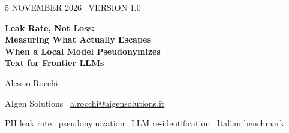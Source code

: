 \documentclass[11pt,a4paper]{article}
\begin{document}
\thispagestyle{empty}
\hfill{\sffamily\small\color{muted}5 NOVEMBER 2026 \textperiodcentered\ VERSION 1.0}

\vspace{1.4em}
{\noindent\sffamily\bfseries\fontsize{22}{27}\selectfont\color{aigen}Leak Rate, Not Loss:\\ Measuring What Actually Escapes\\ When a Local Model Pseudonymizes\\ Text for Frontier LLMs\par}

\vspace{0.9em}\noindent{\color{aigen}\rule{\textwidth}{0.5pt}}

\vspace{0.7em}
{\noindent\sffamily\large Alessio Rocchi\par}
{\noindent\sffamily\small\color{muted}AIgen Solutions \textperiodcentered\ \href{mailto:a.rocchi@aigensolutions.it}{a.rocchi@aigensolutions.it}\par}
{\noindent\sffamily\small\color{aigen}PII leak rate \textperiodcentered\ pseudonymization \textperiodcentered\ LLM re-identification \textperiodcentered\ Italian benchmark\par}
\end{document}
